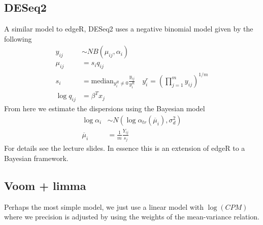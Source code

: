 \documentclass[11pt]{article}
\begin{document}
\subsection{DESeq2}
A similar model to edgeR, DESeq2 uses a negative binomial model given by the following 
\begin{align*}
	y_{ij}&\sim NB(\mu_{ij}, \alpha_i)\\
	\mu_{ij}& = s_iq_{ij}\\
	s_i &= \text{median}_{y_i^R\neq 0}\frac{y_{ij}}{y_i^R}\quad y_i^r = \left(\prod_{j=1}^my_{ij}\right)^{1/m}\\
	\log q_{ij} &= \beta^Tx_j
\end{align*}
From here we estimate the dispersions using the Bayesian model 
\begin{align*}
	\log\alpha_i&\sim N(\log\alpha_{tr}(\overline{\mu}_i),\sigma_d^2)\\
	\overline{\mu}_i &= \frac{1}{m}\frac{Y_{ij}}{s_j}
\end{align*}
For details see the lecture slides. In essence this is an extension of edgeR to a Bayesian framework. 

\subsection{Voom + limma}
Perhaps the most simple model, we just use a linear model with $\log(CPM)$ where we precision is adjusted by using the weights of the mean-variance relation. 
\end{document}
